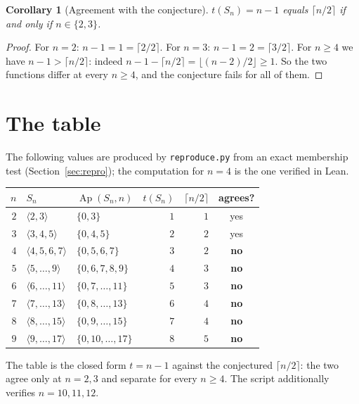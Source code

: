 \documentclass[11pt]{article}
\newtheorem{corollary}[theorem]{Corollary}
\theoremstyle{definition}
\theoremstyle{remark}
\newcommand{\Ap}{\operatorname{Ap}}
\newcommand{\gen}[1]{\langle #1 \rangle}
\begin{document}
\begin{corollary}[Agreement with the conjecture]\label{cor:agree}
$t(S_n) = n - 1$ equals $\lceil n/2 \rceil$ if and only if $n \in \{2,3\}$.
\end{corollary}

\begin{proof}
For $n = 2$: $n - 1 = 1 = \lceil 2/2 \rceil$. For $n = 3$:
$n - 1 = 2 = \lceil 3/2 \rceil$. For $n \ge 4$ we have
$n - 1 > \lceil n/2 \rceil$: indeed $n - 1 - \lceil n/2 \rceil
= \lfloor (n-2)/2 \rfloor \ge 1$. So the two functions differ at every
$n \ge 4$, and the conjecture fails for all of them.
\end{proof}

\section{The table}\label{sec:table}

The following values are produced by \texttt{reproduce.py} from an exact
membership test (Section~\ref{sec:repro}); the computation for $n = 4$ is the
one verified in Lean.

\begin{center}
\begin{tabular}{r l l r r c}
\toprule
$n$ & $S_n$ & $\Ap(S_n, n)$ & $t(S_n)$ & $\lceil n/2 \rceil$ & agrees? \\
\midrule
$2$ & $\gen{2,3}$       & $\{0,3\}$                   & $1$ & $1$ & yes \\
$3$ & $\gen{3,4,5}$     & $\{0,4,5\}$                 & $2$ & $2$ & yes \\
$4$ & $\gen{4,5,6,7}$   & $\{0,5,6,7\}$               & $3$ & $2$ & \textbf{no} \\
$5$ & $\gen{5,\dots,9}$ & $\{0,6,7,8,9\}$             & $4$ & $3$ & \textbf{no} \\
$6$ & $\gen{6,\dots,11}$& $\{0,7,\dots,11\}$          & $5$ & $3$ & \textbf{no} \\
$7$ & $\gen{7,\dots,13}$& $\{0,8,\dots,13\}$          & $6$ & $4$ & \textbf{no} \\
$8$ & $\gen{8,\dots,15}$& $\{0,9,\dots,15\}$          & $7$ & $4$ & \textbf{no} \\
$9$ & $\gen{9,\dots,17}$& $\{0,10,\dots,17\}$         & $8$ & $5$ & \textbf{no} \\
\bottomrule
\end{tabular}
\end{center}

The table is the closed form $t = n - 1$ against the conjectured
$\lceil n/2 \rceil$: the two agree only at $n = 2,3$ and separate for every
$n \ge 4$. The script additionally verifies $n = 10, 11, 12$.
\end{document}
